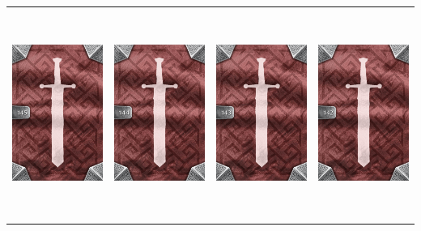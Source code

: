 \documentclass{minimal}
\begin{document}
{\begin{longtable}{llll}
\includegraphics[width=44mm,height=68mm]{./64-151/gh-145-mask-of-death-back.png} &
\includegraphics[width=44mm,height=68mm]{./64-151/gh-144-pendant-of-the-plague-back.png} &
\includegraphics[width=44mm,height=68mm]{./64-151/gh-143-smoke-elixir-back.png} &
\includegraphics[width=44mm,height=68mm]{./64-151/gh-142-phasing-idol-back.png}\\ 

\end{longtable}}
\end{document}
